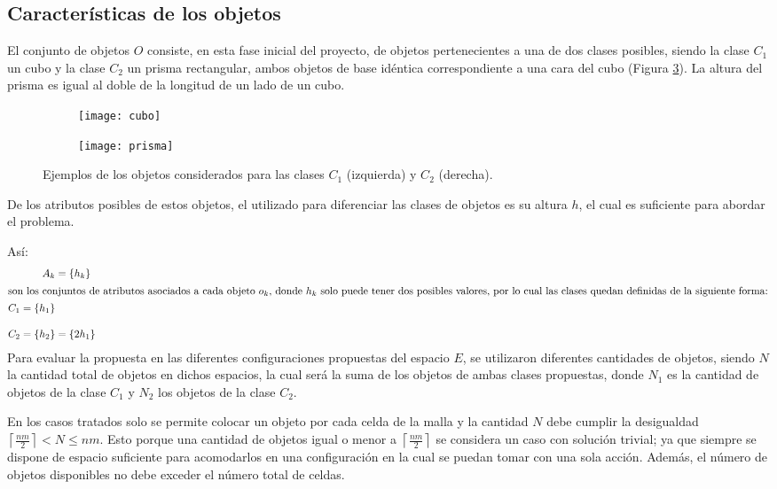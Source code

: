 \subsection{Características de los objetos}
\label{subsec:objetos}
%
%
El conjunto de objetos $O$ consiste, en esta fase inicial del proyecto, de objetos pertenecientes a una de dos clases posibles, siendo la clase $C_1$ un cubo y la clase $C_2$ un prisma rectangular, ambos objetos de base idéntica correspondiente a una cara del cubo (Figura \ref{fig:objetos}).
La altura del prisma es igual al doble de la longitud de un lado de un cubo.
%
\begin{figure}[H]
	\begin{subfigure}[b]{0.2\textwidth}
		\texttt{[image: cubo]}%
		\label{subfig:cubo}%
	\end{subfigure}%
	\hspace{1.5cm}
	\begin{subfigure}[b]{0.2\textwidth}
		\texttt{[image: prisma]}%
		\label{subfig:prisma}%
	\end{subfigure}%
	\caption{Ejemplos de los objetos considerados para las clases $C_1$ (izquierda) y $C_2$ (derecha).}%
	\label{fig:objetos}%
\end{figure}
%
De los atributos posibles de estos objetos, el utilizado para diferenciar las clases de objetos es su altura $h$, el cual es suficiente para abordar el problema.

Así:
%
\begin{align}
	\label{eq:atributos_diferenciadores}
	A_k &= \{h_k\} \\
	\intertext{son los conjuntos de atributos asociados a cada objeto $o_k$, donde $h_k$ solo puede tener dos posibles valores, por lo cual las clases quedan definidas de la siguiente forma:}
	\begin{split}
		C_1 &= \{h_1\} \\[1em]
		C_2 &= \{h_2\} \rlap{${}= \{2h_1\}$}
	\end{split}
\end{align}
%
Para evaluar la propuesta en las diferentes configuraciones propuestas del espacio $E$, se utilizaron diferentes cantidades de objetos, siendo $N$ la cantidad total de objetos en dichos espacios, la cual será la suma de los objetos de ambas clases propuestas, donde $N_1$ es la cantidad de objetos de la clase $C_1$ y $N_2$ los objetos de la clase $C_2$.

En los casos tratados solo se permite colocar un objeto por cada celda de la malla y la cantidad $N$ debe cumplir la desigualdad $\left\lceil \frac{nm}{2} \right\rceil < N \leq nm$.
Esto porque una cantidad de objetos igual o menor a $\left\lceil \frac{nm}{2} \right\rceil$ se considera un caso con solución trivial; ya que siempre se dispone de espacio suficiente para acomodarlos en una configuración en la cual se puedan tomar con una sola acción.
Además, el número de objetos disponibles no debe exceder el número total de celdas.
 
